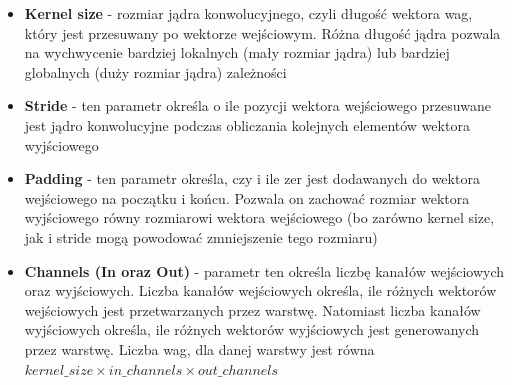 \begin{itemize}
  \item \textbf{Kernel size} - rozmiar jądra konwolucyjnego, czyli długość wektora wag, który jest
    przesuwany po wektorze wejściowym. Różna długość jądra pozwala na wychwycenie bardziej lokalnych
    (mały rozmiar jądra) lub bardziej globalnych (duży rozmiar jądra) zależności
  \item \textbf{Stride} - ten parametr określa o ile pozycji wektora wejściowego przesuwane jest jądro
    konwolucyjne podczas obliczania kolejnych elementów wektora wyjściowego

  \item \textbf{Padding} - ten parametr określa, czy i ile zer jest dodawanych do wektora wejściowego
    na początku i końcu. Pozwala on zachować rozmiar wektora wyjściowego równy rozmiarowi wektora wejściowego
    (bo zarówno kernel size, jak i stride mogą powodować zmniejszenie tego rozmiaru)
  \item \textbf{Channels (In oraz Out)} - parametr ten określa liczbę kanałów wejściowych oraz wyjściowych.
    Liczba kanałów wejściowych określa, ile różnych wektorów wejściowych jest przetwarzanych przez warstwę. Natomiast
    liczba kanałów wyjściowych określa, ile różnych wektorów wyjściowych jest generowanych przez warstwę. Liczba wag, dla
    danej warstwy jest równa $kernel\_size \times in\_channels \times out\_channels$
\end{itemize}
